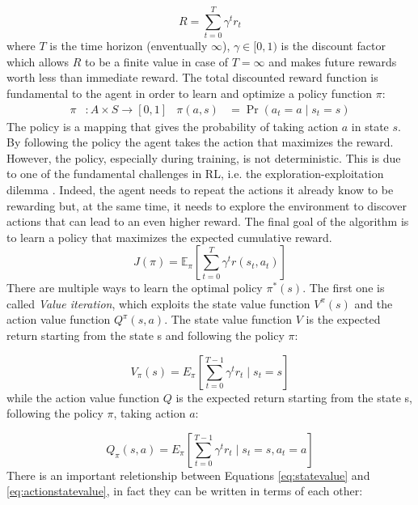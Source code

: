 \begin{equation}
  \label{eq:totalreward}
  R=\sum _{t=0}^{T}\gamma ^{t}r_{t}
\end{equation}
where $T$ is the time horizon (enventually $\infty$), $\gamma \in [0,1)$ is the discount factor which allows $R$ to be a finite value in case of $T=\infty$ and makes future rewards worth less than immediate reward. The total discounted reward function is fundamental to the agent in order to learn and optimize a policy function $\pi$:
\begin{align}
  \displaystyle \pi &:A\times S\rightarrow [0,1] &  \displaystyle \pi (a,s)&=\Pr(a_{t}=a\mid s_{t}=s) \label{eq:label1}
\end{align}
The policy is a mapping that gives the probability of taking action $a$ in state $s$. By following the policy the agent takes the action that maximizes the reward. However, the policy, especially during training, is not deterministic. This is due to one of the fundamental challenges in RL, i.e. the exploration-exploitation dilemma \citep{Sutton1998}. Indeed, the agent needs to repeat the actions it already know to be rewarding but, at the same time, it needs to explore the environment to discover actions that can lead to an even higher reward. 
The final goal of the algorithm is to learn a policy that maximizes the expected cumulative reward.
\begin{equation}
  \label{eq:rlobj}
  J(\pi)=\mathbb{E}_{\pi}[\sum _{t=0}^{T}\gamma ^{t}r(s_{t},a_{t})]
\end{equation}
There are multiple ways to learn the optimal policy $\pi^{*}(s)$. The first one is called \textit{Value iteration}, which exploits the state value function $V^{\pi}(s)$ and the action value function $Q^{\pi}(s, a)$. The state value function $V$ is the expected return starting from the state s and following the policy $\pi$:

\begin{equation}
  \label{eq:statevalue}
  V_{\pi}(s) = E_{\pi}[\sum_{t=0}^{T-1} \gamma^t r_t \mid s_t=s]
\end{equation}
while the action value function $Q$ is the expected return starting from the state s, following the policy $\pi$, taking action $a$:

\begin{equation}
  \label{eq:actionstatevalue}
  Q_{\pi}(s,a) = E_{\pi}[\sum_{t=0}^{T-1} \gamma^t r_t \mid s_t=s, a_t = a]
\end{equation}
There is an important reletionship between Equations \ref{eq:statevalue} and \ref{eq:actionstatevalue}, in fact they can be written in terms of each other:

